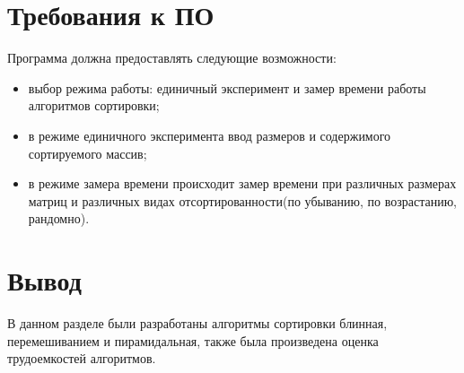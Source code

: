 \section{Требования к ПО}
Программа должна предоставлять следующие возможности:
\begin{itemize}[left=\parindent]
    \item выбор режима работы: единичный эксперимент и замер времени работы алгоритмов сортировки;
    \item в режиме единичного эксперимента ввод размеров и содержимого сортируемого массив;
    \item в режиме замера времени происходит замер времени при различных
          размерах матриц и различных видах отсортированности(по убыванию, по возрастанию, рандомно).
\end{itemize}

\section*{Вывод}

В данном разделе были разработаны алгоритмы сортировки блинная,
перемешиванием и пирамидальная, также была произведена оценка трудоемкостей
алгоритмов.